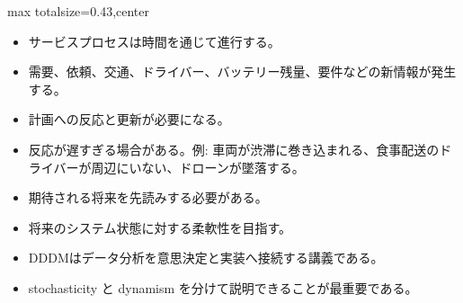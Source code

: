 \clearpage
{}
\begin{minipage}[t]{0.405\textwidth}
\begin{adjustbox}{max totalsize={\textwidth}{0.43\textheight},center}
\begin{minipage}{\textwidth}\scriptsize
{}\begin{itemize}
\item サービスプロセスは時間を通じて進行する。
\item 需要、依頼、交通、ドライバー、バッテリー残量、要件などの新情報が発生する。
\item 計画への反応と更新が必要になる。
\item 反応が遅すぎる場合がある。例: 車両が渋滞に巻き込まれる、食事配送のドライバーが周辺にいない、ドローンが墜落する。
\item 期待される将来を先読みする必要がある。
\item 将来のシステム状態に対する柔軟性を目指す。
\end{itemize}\begin{itemize}
\item DDDMはデータ分析を意思決定と実装へ接続する講義である。
\item stochasticity と dynamism を分けて説明できることが最重要である。
\end{itemize}
\end{minipage}
\end{adjustbox}
\end{minipage}\hfill

